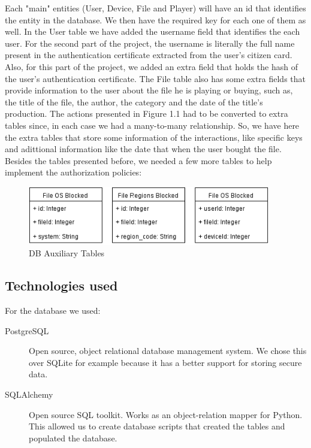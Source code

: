 \documentclass[11pt,a4paper]{report}
\begin{document}
Each "main" entities (User, Device, File and Player) will have an id that identifies the entity in the database.
We then have the required key for each one of them as well.
\newline In the User table we have added the username field that identifies the each user. For the second part of the project, the username is literally the full name present in the authentication certificate extracted from the user's citizen card. Also, for this part of the project, we added an extra field that holds the hash of the user's authentication certificate.
\newline The File table also has some extra fields that provide information to the user about the file he is playing or buying, such as, the title of the file, the author, the category and the date of the title's production.
\newline The actions presented in Figure 1.1 had to be converted to extra tables since, in each case we had a many-to-many relationship. So, we have here the extra tables that store some information of the interactions, like specific keys and adittional information like the date that when the user bought the file. 
\newline Besides the tables presented before, we needed a few more tables to help implement the authorization policies:

\begin{figure}[H]
\centerline{\includegraphics[width=300pt]{images/auxTables.png}}
\caption{DB Auxiliary Tables}
\label{tables}
\end{figure}

\subsection{Technologies used}
For the database we used:
\begin{description}
  \item[PostgreSQL] Open source, object relational database management system. We chose this over SQLite for example because it has a better support for storing secure data.
  \item[SQLAlchemy] Open source SQL toolkit. Works as an object-relation mapper for Python. This allowed us to create database scripts that created the tables and populated the database.
\end{description}
\end{document}
